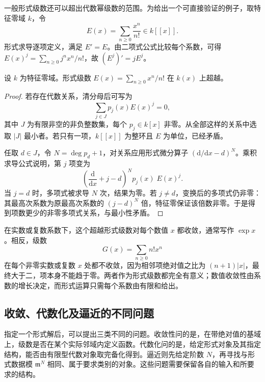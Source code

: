 一般形式级数还可以超出代数幂级数的范围。为给出一个可直接验证的例子，取特征零域 \(k\)，令
\[
	E(x)=\sum_{n\geq0}\frac{x^n}{n!}\in k[[x]].
\]
形式求导逐项定义，满足 \(E'=E\)。由二项式公式比较每个系数，可得 \(E(x)^j=\sum_{n\geq0}j^n x^n/n!\)，故 \((E^j)'=jE^j\)。

\begin{proposition}\label{g5:prop:formal-exponential-transcendental}
	设 \(k\) 为特征零域。形式级数 \(E(x)=\sum_{n\geq0}x^n/n!\) 在 \(k(x)\) 上超越。
\end{proposition}
\begin{proof}
	若存在代数关系，清分母后可写为
	\[
		\sum_{j\in J}p_j(x)E(x)^j=0,
	\]
	其中 \(J\) 为有限非空的非负整数集，每个 \(p_j\in k[x]\) 非零。从全部这样的关系中选取 \(\lvert J\rvert\) 最小者。若只有一项，\(k[[x]]\) 为整环且 \(E\) 为单位，已经矛盾。

	任取 \(d\in J\)，令 \(N=\deg p_d+1\)，对关系应用形式微分算子 \((\mathrm d/\mathrm dx-d)^N\)。乘积求导公式说明，第 \(j\) 项变为
	\[
		\left(\frac{\mathrm d}{\mathrm dx}+j-d\right)^N p_j(x)\;E(x)^j.
	\]
	当 \(j=d\) 时，多项式被求导 \(N\) 次，结果为零。若 \(j\ne d\)，变换后的多项式仍非零：其最高次系数为原最高次系数的 \((j-d)^N\) 倍，特征零保证该倍数非零。于是得到项数更少的非零多项式关系，与最小性矛盾。
\end{proof}

在实数或复数系数下，这个超越形式级数对每个数值 \(x\) 都收敛，通常写作 \(\exp x\)。相反，级数
\[
	G(x)=\sum_{n\geq0}n!x^n
\]
在每个非零实数或复数 \(x\) 处都不收敛，因为相邻项绝对值之比为 \((n+1)|x|\)，最终大于二，项本身不能趋于零。两者作为形式级数都完全有意义；数值收敛性由系数的增长决定，而形式运算只需每个系数由有限和给出。

\subsection{收敛、代数化及逼近的不同问题}
\label{g5:subsec:0705:03}

指定一个形式解后，可以提出三类不同的问题。收敛性问的是，在带绝对值的基域上，级数是否在某个实际邻域内定义函数。代数化问的是，给定形式对象及其指定结构，能否由有限型代数对象取完备化得到。逼近则先给定阶数 \(N\)，再寻找与形式数据模 \(\mathfrak m^N\) 相同、属于要求类别的对象。这些问题需要保留各自的输入和所要求的结构。

